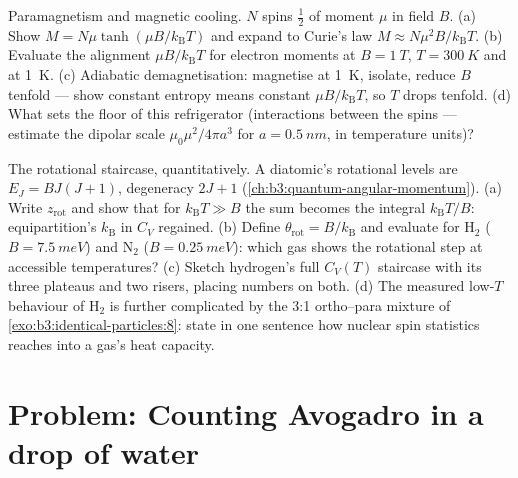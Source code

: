\begin{exercise}[$\star\star\star$]\label{exo:b3:canonical-ensemble:11}
Paramagnetism and magnetic cooling. $N$ spins $\tfrac12$ of moment
$\mu$ in field $B$. (a) Show $M = N\mu\tanh(\mu B/k_{\text{B}}T)$
and expand to Curie's law $M \approx N\mu^2B/k_{\text{B}}T$. (b)
Evaluate the alignment $\mu B/k_{\text{B}}T$ for electron moments
at $B = \qty{1}{T}$, $T = \qty{300}{K}$ and at \qty{1}{K}. (c)
Adiabatic demagnetisation: magnetise at \qty{1}{K}, isolate,
reduce $B$ tenfold --- show constant entropy means constant
$\mu B/k_{\text{B}}T$, so $T$ drops tenfold. (d) What sets the
floor of this refrigerator (interactions between the spins ---
estimate the dipolar scale $\mu_0\mu^2/4\pi a^3$ for $a =
\qty{0.5}{nm}$, in temperature units)?
\end{exercise}

\begin{exercise}[$\star\star\star$]\label{exo:b3:canonical-ensemble:12}
The rotational staircase, quantitatively. A diatomic's rotational
levels are $E_J = BJ(J+1)$, degeneracy $2J + 1$
(\cref{ch:b3:quantum-angular-momentum}). (a) Write $z_{\text{rot}}$
and show that for $k_{\text{B}}T \gg B$ the sum becomes the
integral $k_{\text{B}}T/B$: equipartition's $k_{\text{B}}$ in
$C_V$ regained. (b) Define $\theta_{\text{rot}} =
B/k_{\text{B}}$ and evaluate for H$_2$ ($B = \qty{7.5}{meV}$) and
N$_2$ ($B = \qty{0.25}{meV}$): which gas shows the rotational
step at accessible temperatures? (c) Sketch hydrogen's full $C_V(T)$
staircase with its three plateaus and two risers, placing numbers
on both. (d) The measured low-$T$ behaviour of H$_2$ is further
complicated by the 3:1 ortho--para mixture of
\cref{exo:b3:identical-particles:8}: state in one sentence how
nuclear spin statistics reaches into a gas's heat capacity.
\end{exercise}

\section{Problem: Counting Avogadro in a drop of water}

